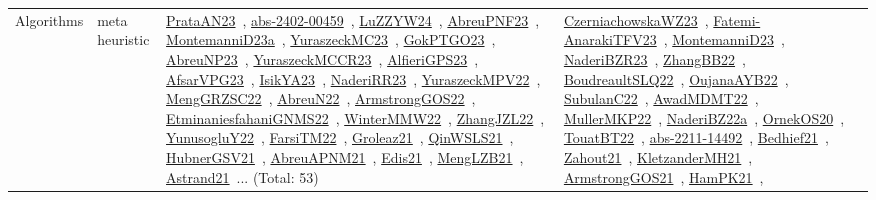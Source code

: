 {\begin{longtable}{lp{3cm}>{\raggedright\arraybackslash}p{6cm}>{\raggedright\arraybackslash}p{6cm}>{\raggedright\arraybackslash}p{8cm}}
Algorithms & meta heuristic & \href{../works/PrataAN23.pdf}{PrataAN23}~\cite{PrataAN23}, \href{../works/abs-2402-00459.pdf}{abs-2402-00459}~\cite{abs-2402-00459}, \href{../works/LuZZYW24.pdf}{LuZZYW24}~\cite{LuZZYW24}, \href{../works/AbreuPNF23.pdf}{AbreuPNF23}~\cite{AbreuPNF23}, \href{../works/MontemanniD23a.pdf}{MontemanniD23a}~\cite{MontemanniD23a}, \href{../works/YuraszeckMC23.pdf}{YuraszeckMC23}~\cite{YuraszeckMC23}, \href{../works/GokPTGO23.pdf}{GokPTGO23}~\cite{GokPTGO23}, \href{../works/AbreuNP23.pdf}{AbreuNP23}~\cite{AbreuNP23}, \href{../works/YuraszeckMCCR23.pdf}{YuraszeckMCCR23}~\cite{YuraszeckMCCR23}, \href{../works/AlfieriGPS23.pdf}{AlfieriGPS23}~\cite{AlfieriGPS23}, \href{../works/AfsarVPG23.pdf}{AfsarVPG23}~\cite{AfsarVPG23}, \href{../works/IsikYA23.pdf}{IsikYA23}~\cite{IsikYA23}, \href{../works/NaderiRR23.pdf}{NaderiRR23}~\cite{NaderiRR23}, \href{../works/YuraszeckMPV22.pdf}{YuraszeckMPV22}~\cite{YuraszeckMPV22}, \href{../works/MengGRZSC22.pdf}{MengGRZSC22}~\cite{MengGRZSC22}, \href{../works/AbreuN22.pdf}{AbreuN22}~\cite{AbreuN22}, \href{../works/ArmstrongGOS22.pdf}{ArmstrongGOS22}~\cite{ArmstrongGOS22}, \href{../works/EtminaniesfahaniGNMS22.pdf}{EtminaniesfahaniGNMS22}~\cite{EtminaniesfahaniGNMS22}, \href{../works/WinterMMW22.pdf}{WinterMMW22}~\cite{WinterMMW22}, \href{../works/ZhangJZL22.pdf}{ZhangJZL22}~\cite{ZhangJZL22}, \href{../works/YunusogluY22.pdf}{YunusogluY22}~\cite{YunusogluY22}, \href{../works/FarsiTM22.pdf}{FarsiTM22}~\cite{FarsiTM22}, \href{../works/Groleaz21.pdf}{Groleaz21}~\cite{Groleaz21}, \href{../works/QinWSLS21.pdf}{QinWSLS21}~\cite{QinWSLS21}, \href{../works/HubnerGSV21.pdf}{HubnerGSV21}~\cite{HubnerGSV21}, \href{../works/AbreuAPNM21.pdf}{AbreuAPNM21}~\cite{AbreuAPNM21}, \href{../works/Edis21.pdf}{Edis21}~\cite{Edis21}, \href{../works/MengLZB21.pdf}{MengLZB21}~\cite{MengLZB21}, \href{../works/Astrand21.pdf}{Astrand21}~\cite{Astrand21}... (Total: 53) & \href{../works/CzerniachowskaWZ23.pdf}{CzerniachowskaWZ23}~\cite{CzerniachowskaWZ23}, \href{../works/Fatemi-AnarakiTFV23.pdf}{Fatemi-AnarakiTFV23}~\cite{Fatemi-AnarakiTFV23}, \href{../works/MontemanniD23.pdf}{MontemanniD23}~\cite{MontemanniD23}, \href{../works/NaderiBZR23.pdf}{NaderiBZR23}~\cite{NaderiBZR23}, \href{../works/ZhangBB22.pdf}{ZhangBB22}~\cite{ZhangBB22}, \href{../works/BoudreaultSLQ22.pdf}{BoudreaultSLQ22}~\cite{BoudreaultSLQ22}, \href{../works/OujanaAYB22.pdf}{OujanaAYB22}~\cite{OujanaAYB22}, \href{../works/SubulanC22.pdf}{SubulanC22}~\cite{SubulanC22}, \href{../works/AwadMDMT22.pdf}{AwadMDMT22}~\cite{AwadMDMT22}, \href{../works/MullerMKP22.pdf}{MullerMKP22}~\cite{MullerMKP22}, \href{../works/NaderiBZ22a.pdf}{NaderiBZ22a}~\cite{NaderiBZ22a}, \href{../works/OrnekOS20.pdf}{OrnekOS20}~\cite{OrnekOS20}, \href{../works/TouatBT22.pdf}{TouatBT22}~\cite{TouatBT22}, \href{../works/abs-2211-14492.pdf}{abs-2211-14492}~\cite{abs-2211-14492}, \href{../works/Bedhief21.pdf}{Bedhief21}~\cite{Bedhief21}, \href{../works/Zahout21.pdf}{Zahout21}~\cite{Zahout21}, \href{../works/KletzanderMH21.pdf}{KletzanderMH21}~\cite{KletzanderMH21}, \href{../works/ArmstrongGOS21.pdf}{ArmstrongGOS21}~\cite{ArmstrongGOS21}, \href{../works/HamPK21.pdf}{HamPK21}~\cite{HamPK21}, 
\end{longtable}}
